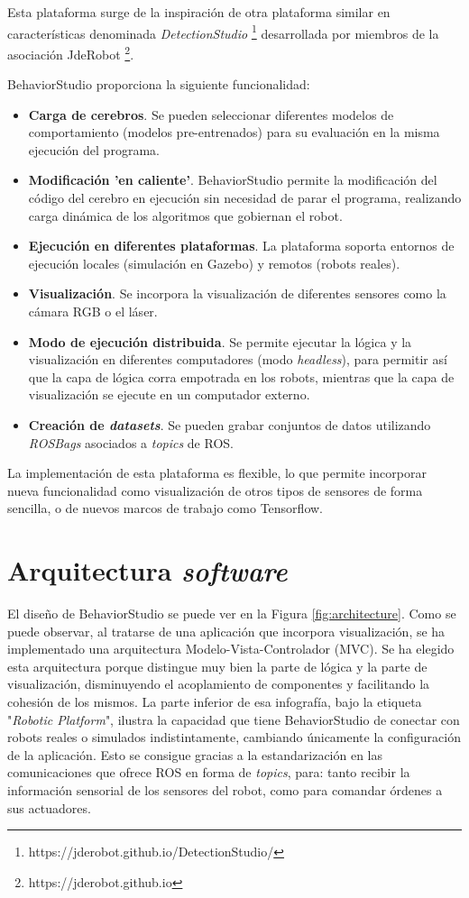 Esta plataforma surge de la inspiración de otra plataforma similar en características denominada \textit{DetectionStudio} \footnote{https://jderobot.github.io/DetectionStudio/} desarrollada por miembros de la asociación JdeRobot \footnote{https://jderobot.github.io}.

\noindent BehaviorStudio proporciona la siguiente funcionalidad:

\begin{itemize}
    \item \textbf{Carga de cerebros}. Se pueden seleccionar diferentes modelos de comportamiento (modelos pre-entrenados) para su evaluación en la misma ejecución del programa.
    \item \textbf{Modificación 'en caliente'}. BehaviorStudio permite la modificación del código del cerebro en ejecución sin necesidad de parar el programa, realizando carga dinámica de los algoritmos que gobiernan el robot.
    \item \textbf{Ejecución en diferentes plataformas}. La plataforma soporta entornos de ejecución locales (simulación en Gazebo) y remotos (robots reales).
    \item \textbf{Visualización}. Se incorpora la visualización de diferentes sensores como la cámara RGB o el láser.
    \item \textbf{Modo de ejecución distribuida}. Se permite ejecutar la lógica y la visualización en diferentes computadores (modo \textit{headless}), para permitir así que la capa de lógica corra empotrada en los robots, mientras que la capa de visualización se ejecute en un computador externo.
    \item \textbf{Creación de \textit{datasets}}. Se pueden grabar conjuntos de datos utilizando \textit{ROSBags} asociados a \textit{topics} de ROS.
\end{itemize}

La implementación de esta plataforma es flexible, lo que permite incorporar nueva funcionalidad como visualización de otros tipos de sensores de forma sencilla, o de nuevos marcos de trabajo como Tensorflow.

\section{Arquitectura \textit{software}}

El diseño de BehaviorStudio se puede ver en la Figura \ref{fig:architecture}. Como se puede observar, al tratarse de una aplicación que incorpora visualización, se ha implementado una arquitectura Modelo-Vista-Controlador (MVC). Se ha elegido esta arquitectura porque distingue muy bien la parte de lógica y la parte de visualización, disminuyendo el acoplamiento de componentes y facilitando la cohesión de los mismos. La parte inferior de esa infografía, bajo la etiqueta "\textit{Robotic Platform}", ilustra la capacidad que tiene BehaviorStudio de conectar con robots reales o simulados indistintamente, cambiando únicamente la configuración de la aplicación. Esto se consigue gracias a la estandarización en las comunicaciones que ofrece ROS en forma de \textit{topics}, para: tanto recibir la información sensorial de los sensores del robot, como para comandar órdenes a sus actuadores.

